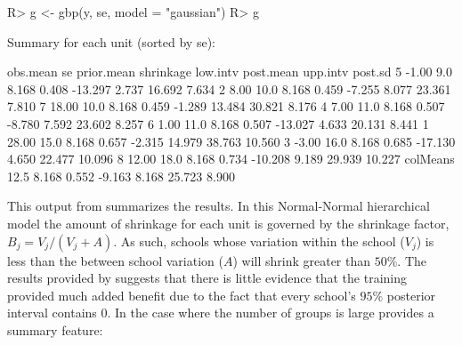 \documentclass[article]{jss}
\begin{document}
\begin{CodeChunk}
\begin{CodeInput}
R> g <- gbp(y, se, model = "gaussian")
R> g
\end{CodeInput}
\begin{CodeOutput}
Summary for each unit (sorted by se):

         obs.mean   se prior.mean shrinkage low.intv post.mean upp.intv post.sd
5           -1.00  9.0      8.168     0.408  -13.297     2.737   16.692   7.634
2            8.00 10.0      8.168     0.459   -7.255     8.077   23.361   7.810
7           18.00 10.0      8.168     0.459   -1.289    13.484   30.821   8.176
4            7.00 11.0      8.168     0.507   -8.780     7.592   23.602   8.257
6            1.00 11.0      8.168     0.507  -13.027     4.633   20.131   8.441
1           28.00 15.0      8.168     0.657   -2.315    14.979   38.763  10.560
3           -3.00 16.0      8.168     0.685  -17.130     4.650   22.477  10.096
8           12.00 18.0      8.168     0.734  -10.208     9.189   29.939  10.227
colMeans          12.5      8.168     0.552   -9.163     8.168   25.723   8.900
\end{CodeOutput}
\end{CodeChunk}
This output from  summarizes the results. In this Normal-Normal hierarchical model the amount of shrinkage for each unit is governed by the shrinkage factor, $B_j = V_j/(V_j + A)$. As such, schools whose variation within the school ($V_{j}$) is less than the between school variation ($A$) will shrink greater than $50\%$. The results provided by  suggests that there is little evidence that the training provided much added benefit due to the fact that every school's $95\%$ posterior interval contains 0. In the case where the number of groups is large  provides a summary feature:
\end{document}
